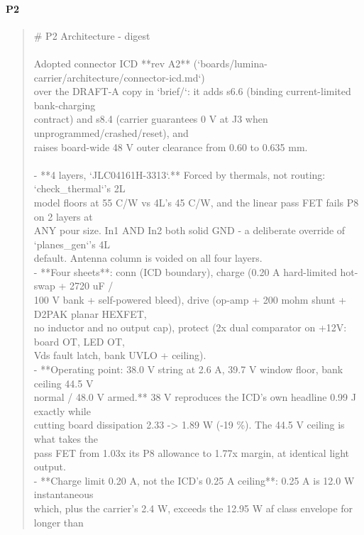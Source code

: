 \documentclass[11pt,a4paper]{article}
\begin{document}
\paragraph*{P2}
\begin{quote}\small\ttfamily\raggedright
\# P2 Architecture - digest\\
~\\
Adopted connector ICD {*}{*}rev A2{*}{*} (`boards/lumina-carrier/architecture/connector-icd.md`)\\
over the DRAFT-A copy in `brief/`: it adds s6.6 (binding current-limited bank-charging\\
contract) and s8.4 (carrier guarantees 0 V at J3 when unprogrammed/crashed/reset), and\\
raises board-wide 48 V outer clearance from 0.60 to 0.635 mm.\\
~\\
- {*}{*}4 layers, `JLC04161H-3313`.{*}{*} Forced by thermals, not routing: `check\_thermal`'s 2L\\
  model floors at 55 C/W vs 4L's 45 C/W, and the linear pass FET fails P8 on 2 layers at\\
  ANY pour size. In1 AND In2 both solid GND - a deliberate override of `planes\_gen`'s 4L\\
  default. Antenna column is voided on all four layers.\\
- {*}{*}Four sheets{*}{*}: conn (ICD boundary), charge (0.20 A hard-limited hot-swap + 2720 uF /\\
  100 V bank + self-powered bleed), drive (op-amp + 200 mohm shunt + D2PAK planar HEXFET,\\
  no inductor and no output cap), protect (2x dual comparator on +12V: board OT, LED OT,\\
  Vds fault latch, bank UVLO + ceiling).\\
- {*}{*}Operating point: 38.0 V string at 2.6 A, 39.7 V window floor, bank ceiling 44.5 V\\
  normal / 48.0 V armed.{*}{*} 38 V reproduces the ICD's own headline 0.99 J exactly while\\
  cutting board dissipation 2.33 -\textgreater{} 1.89 W (-19 \%). The 44.5 V ceiling is what takes the\\
  pass FET from 1.03x its P8 allowance to 1.77x margin, at identical light output.\\
- {*}{*}Charge limit 0.20 A, not the ICD's 0.25 A ceiling{*}{*}: 0.25 A is 12.0 W instantaneous\\
  which, plus the carrier's 2.4 W, exceeds the 12.95 W af class envelope for longer than\\

\end{quote}
\end{document}
